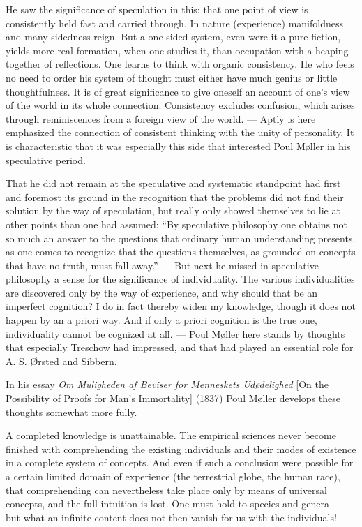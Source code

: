 \documentclass[12pt,a4paper]{book}
\newcommand{\opage}[1]{\marginnote{\footnotesize\textit{[#1]}}}
\begin{document}
He saw the significance of speculation in this: that one point of view is consistently held
fast and carried through. In nature (experience) manifoldness and many-sidedness reign. But
a one-sided system, even were it a pure fiction, yields more real formation, when one
studies it, than occupation with a heaping-together of reflections. One learns to think with
organic consistency. He who feels no need to order his system of thought must either have
much genius or little thoughtfulness. It is of great significance to give oneself an account
of one's view of the world in its whole connection. Consistency excludes confusion, which
arises through reminiscences from a foreign view of the world. --- Aptly is here emphasized
the connection of consistent thinking with the unity of personality. It is characteristic
that it was especially this side that interested Poul Møller in his speculative period.

That he did not remain at the speculative and systematic standpoint had first and foremost
its ground in the recognition that the problems did not find their solution by the way of
speculation, but really only showed themselves to lie at other points than one had assumed:
``By speculative philosophy one obtains not so much an answer to the questions that ordinary
human understanding presents, as one comes \opage{120}to recognize that the questions themselves, as
grounded on concepts that have no truth, must fall away.'' --- But next he missed in
speculative philosophy a sense for the significance of individuality. The various
individualities are discovered only by the way of experience, and why should that be an
imperfect cognition? I do in fact thereby widen my knowledge, though it does not happen by
an a priori way. And if only a priori cognition is the true one, individuality cannot be
cognized at all. --- Poul Møller here stands by thoughts that especially Treschow had
impressed, and that had played an essential role for A. S. Ørsted and Sibbern.

In his essay \emph{Om Muligheden af Beviser for Menneskets Udødelighed} [On the Possibility
of Proofs for Man's Immortality] (1837) Poul Møller develops these thoughts somewhat more
fully.

A completed knowledge is unattainable. The empirical sciences never become finished with
comprehending the existing individuals and their modes of existence in a complete system of
concepts. And even if such a conclusion were possible for a certain limited domain of
experience (the terrestrial globe, the human race), that comprehending can nevertheless take
place only by means of universal concepts, and the full intuition is lost. One must hold to
species and genera --- but what an infinite content does not then vanish for us with the
individuals!
\end{document}
